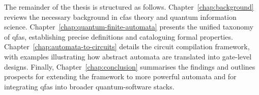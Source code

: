 The remainder of the thesis is structured as follows. Chapter~\ref{chap:background} reviews the necessary background in \glspl{cfa} theory and quantum information science. Chapter~\ref{chap:quantum-finite-automata} presents the unified taxonomy of \glspl{qfa}, establishing precise definitions and cataloguing formal properties. Chapter~\ref{chap:automata-to-circuits} details the circuit compilation framework, with examples illustrating how abstract automata are translated into gate-level designs. Finally, Chapter~\ref{chap:conclusion} summarises the findings and outlines prospects for extending the framework to more powerful automata and for integrating \glspl{qfa} into broader quantum-software stacks.


